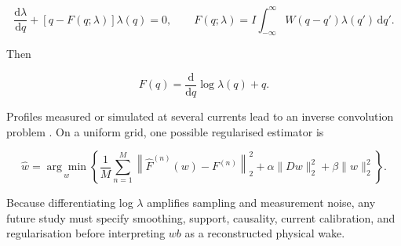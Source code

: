 \begin{equation}
\label{eq:258}
\frac{\mathrm d\lambda}{\mathrm dq}+[q-F(q;\lambda)]\lambda(q)=0,\qquad F(q;\lambda)=I\int_{-\infty}^{\infty}W(q-q')\lambda(q')\,\mathrm dq'.
\end{equation}

Then

\begin{equation}
\label{eq:259}
F(q)=\frac{\mathrm d}{\mathrm dq}\log\lambda(q)+q.
\end{equation}

Profiles measured or simulated at several currents lead to an inverse convolution problem \cite{zhou2023haissinski,funkner2025wake}. On a uniform grid, one possible regularised estimator is

\begin{equation}
\label{eq:260}
\widehat w=\underset{w}{\arg\min}\left\{\frac1M\sum_{n=1}^{M}\left\|\widehat F^{(n)}(w)-F^{(n)}\right\|_2^2+\alpha\|Dw\|_2^2+\beta\|w\|_2^2\right\}.
\end{equation}

Because differentiating log \(\lambda\) amplifies sampling and measurement noise, any future study must specify smoothing, support, causality, current calibration, and regularisation before interpreting \(w b\) as a reconstructed physical wake.

